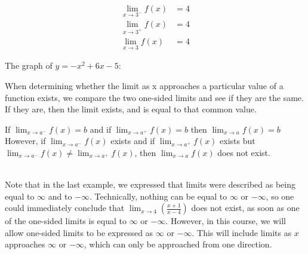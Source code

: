 \documentclass{article}
\begin{document}
\begin{minipage}{0.6\textwidth}
    \begin{align*}
        \lim_{x \to 3^-} f(x) &= 4 \\
        \lim_{x \to 3^+} f(x) &= 4 \\
        \lim_{x \to 3} f(x) &= 4
    \end{align*}
\end{minipage}%
\vspace{0.1em}%
\begin{minipage}{0.6\textwidth}
    The graph of $y=-x^2+6x-5$:
    \begin{center}
    \end{center}
\end{minipage}
When determining whether the limit as x approaches a particular value of a function exists, we compare the two one-sided limits and see if they are the same. If they are, then the limit exists, and is equal to that common value.
\\ 
\begin{tcolorbox}[colback=Orchid!5!white,colframe=cadmiumgreen!75!white,coltitle=white,]
If $\lim _{x \rightarrow a^{-}} f(x)=b$ and if $\lim _{x \rightarrow a^{+}} f(x)=b$ then $\lim _{x \rightarrow a} f(x)=b$
However, if $\lim _{x \rightarrow a^{-}} f(x)$ exists and if $\lim _{x \rightarrow a^{+}} f(x)$ exists but $\lim _{x \rightarrow a^{-}} f(x) \neq \lim _{x \rightarrow a^{+}} f(x)$, then $\lim _{x \rightarrow a} f(x)$ does not exist. \\ \\ 
\end{tcolorbox}

Note that in the last example, we expressed that limits were described as being equal to $\infty$ and to $-\infty$. Technically, nothing can be equal to $\infty$ or $-\infty$, so one could immediately conclude that $\lim_{x \to 4}\left( \frac{x+1}{x-4}\right)$ does not exist, as soon as one of the one-sided limits is equal to $\infty$ or $-\infty$. However, in this course, we will allow one-sided limits to be expressed as $\infty$ or $-\infty$. This will include limits as $x$ approaches $\infty$ or $-\infty$, which can only be approached from one direction. 
\end{document}
